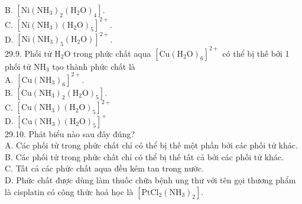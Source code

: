 \documentclass[10pt]{article}
\begin{document}
B. $\left[\mathrm{Ni}\left(\mathrm{NH}_{3}\right)_{2}\left(\mathrm{H}_{2} \mathrm{O}\right)_{4}\right]$.\\
C. $\left[\mathrm{Ni}\left(\mathrm{NH}_{3}\right)\left(\mathrm{H}_{2} \mathrm{O}\right)_{5}\right]^{2+}$.\\
D. $\left[\mathrm{Ni}\left(\mathrm{NH}_{3}\right)_{5}\left(\mathrm{H}_{2} \mathrm{O}\right)\right]^{2+}$.\\
29.9. Phối tử $\mathrm{H}_{2} \mathrm{O}$ trong phức chất aqua $\left[\mathrm{Cu}\left(\mathrm{H}_{2} \mathrm{O}\right)_{6}\right]^{2+}$ có thể bị thế bởi 1 phối tử $\mathrm{NH}_{3}$ tạo thành phức chất là\\
A. $\left[\mathrm{Cu}\left(\mathrm{NH}_{3}\right)_{6}\right]^{2+}$.\\
B. $\left[\mathrm{Cu}\left(\mathrm{NH}_{3}\right)_{2}\left(\mathrm{H}_{2} \mathrm{O}\right)_{5}\right]$.\\
C. $\left[\mathrm{Cu}\left(\mathrm{NH}_{3}\right)\left(\mathrm{H}_{2} \mathrm{O}\right)_{5}\right]^{2+}$\\
D. $\left[\mathrm{Cu}\left(\mathrm{NH}_{3}\right)\left(\mathrm{H}_{2} \mathrm{O}\right)_{5}\right]^{+}$\\
29.10. Phát biểu nào sau đây đúng?\\
A. Các phối tử trong phức chất chỉ có thể bị thế một phần bởi các phối tử khác.\\
B. Các phối tử trong phức chất chỉ có thể bị thế tất cả bởi các phối tử khác.\\
C. Tất cả các phức chất aqua đều kém tan trong nước.\\
D. Phức chất được dùng làm thuốc chữa bệnh ung thư với tên gọi thương phẩm là cisplatin có công thức hoá học là $\left[\mathrm{PtCl}_{2}\left(\mathrm{NH}_{3}\right)_{2}\right]$.
\end{document}
